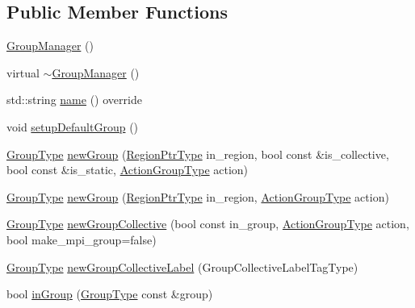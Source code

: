 \subsection*{Public Member Functions}
\begin{DoxyCompactItemize}
\item 
\hyperlink{structvt_1_1group_1_1_group_manager_acfab15afbf80d7b0aa8d95171167b251}{Group\+Manager} ()
\item 
virtual \hyperlink{structvt_1_1group_1_1_group_manager_a87c2b3dc934de17d0ec1372957b234e5}{$\sim$\+Group\+Manager} ()
\item 
std\+::string \hyperlink{structvt_1_1group_1_1_group_manager_a46802e85936e68f9bebc844af1793da3}{name} () override
\item 
void \hyperlink{structvt_1_1group_1_1_group_manager_ac0eb535f215f0edf1bed601b4338220f}{setup\+Default\+Group} ()
\item 
\hyperlink{namespacevt_a27b5e4411c9b6140c49100e050e2f743}{Group\+Type} \hyperlink{structvt_1_1group_1_1_group_manager_aaf9941faced23021a420185203219149}{new\+Group} (\hyperlink{structvt_1_1group_1_1_group_manager_a9192e585fc2f99bfd5a6ff65fc21c40b}{Region\+Ptr\+Type} in\+\_\+region, bool const \&is\+\_\+collective, bool const \&is\+\_\+static, \hyperlink{structvt_1_1group_1_1_group_manager_ae871c5871ad62b530220009c1ee4d4b9}{Action\+Group\+Type} action)
\item 
\hyperlink{namespacevt_a27b5e4411c9b6140c49100e050e2f743}{Group\+Type} \hyperlink{structvt_1_1group_1_1_group_manager_af2986f6eacd693d9906cb397e6e2a706}{new\+Group} (\hyperlink{structvt_1_1group_1_1_group_manager_a9192e585fc2f99bfd5a6ff65fc21c40b}{Region\+Ptr\+Type} in\+\_\+region, \hyperlink{structvt_1_1group_1_1_group_manager_ae871c5871ad62b530220009c1ee4d4b9}{Action\+Group\+Type} action)
\item 
\hyperlink{namespacevt_a27b5e4411c9b6140c49100e050e2f743}{Group\+Type} \hyperlink{structvt_1_1group_1_1_group_manager_a92b301d6cf77af7d57ed822c6f044d58}{new\+Group\+Collective} (bool const in\+\_\+group, \hyperlink{structvt_1_1group_1_1_group_manager_ae871c5871ad62b530220009c1ee4d4b9}{Action\+Group\+Type} action, bool make\+\_\+mpi\+\_\+group=false)
\item 
\hyperlink{namespacevt_a27b5e4411c9b6140c49100e050e2f743}{Group\+Type} \hyperlink{structvt_1_1group_1_1_group_manager_aabd66a33c6306ef472119cd5b2d96d3f}{new\+Group\+Collective\+Label} (Group\+Collective\+Label\+Tag\+Type)
\item 
bool \hyperlink{structvt_1_1group_1_1_group_manager_a9a0520b8e8e35f0f0127db0669c9b648}{in\+Group} (\hyperlink{namespacevt_a27b5e4411c9b6140c49100e050e2f743}{Group\+Type} const \&group)

\end{DoxyCompactItemize}
